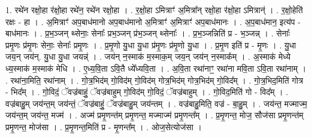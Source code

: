 \documentclass[17pt]{extarticle}
\begin{document}
1. रथे॑न रक्षो॒हा र॑क्षो॒हा रथे॑न॒ रथे॑न रक्षो॒हा । . र॒क्षो॒हा ऽमित्राꣳ॑ अ॒मित्रा᳚न् रक्षो॒हा र॑क्षो॒हा ऽमित्रान्॑ । . र॒क्षो॒हेति॑ रक्षः - हा । . अ॒मित्राꣳ॑ अप॒बाध॑मानो अप॒बाध॑मानो अ॒मित्राꣳ॑ अ॒मित्राꣳ॑ अप॒बाध॑मानः । . अ॒प॒बाध॑मान॒ इत्य॑प - बाध॑मानः । . प्र॒भ॒ञ्जन् थ्सेनाः॒ सेनाः᳚ प्रभ॒ञ्जन् प्र॑भ॒ञ्जन् थ्सेनाः᳚ । . प्र॒भ॒ञ्जन्निति॑ प्र - भ॒ञ्जन्न् । . सेनाः᳚ प्रमृ॒णः प्र॑मृ॒णः सेनाः॒ सेनाः᳚ प्रमृ॒णः । . प्र॒मृ॒णो यु॒धा यु॒धा प्र॑मृ॒णः प्र॑मृ॒णो यु॒धा । . प्र॒मृ॒ण इति॑ प्र - मृ॒णः । . यु॒धा जय॒न् जय॑न्. यु॒धा यु॒धा जयन्न्॑ । . जय॑न् न॒स्माक॑ म॒स्माक॒म् जय॒न् जय॑न् न॒स्माक᳚म् । . अ॒स्माक॑ मेध्ये ध्य॒स्माक॑ म॒स्माक॑ मेधि । . ए॒ध्य॒वि॒ता ऽवि॒तै ध्ये᳚ध्यवि॒ता । . अ॒वि॒ता रथा॑नाꣳ॒॒ रथा॑ना मवि॒ता ऽवि॒ता रथा॑नाम् । . रथा॑ना॒मिति॒ रथा॑नाम् । . गो॒त्र॒भिद॑म् गो॒विद॑म् गो॒विद॑म् गोत्र॒भिद॑म् गोत्र॒भिद॑म् गो॒विद᳚म् । . गो॒त्र॒भिद॒मिति॑ गोत्र - भिद᳚म् । . गो॒विदं॒ ॅवज्र॑बाहुं॒ ॅवज्र॑बाहुम् गो॒विद॑म् गो॒विदं॒ ॅवज्र॑बाहुम् । . गो॒विद॒मिति॑ गो - विद᳚म् । . वज्र॑बाहु॒म् जय॑न्त॒म् जय॑न्तं॒ ॅवज्र॑बाहुं॒ ॅवज्र॑बाहु॒म् जय॑न्तम् । . वज्र॑बाहु॒मिति॒ वज्र॑ - बा॒हु॒म् । . जय॑न्त॒ मज्माज्म॒ जय॑न्त॒म् जय॑न्त॒ मज्म॑ । . अज्म॑ प्रमृ॒णन्त॑म् प्रमृ॒णन्त॒ मज्माज्म॑ प्रमृ॒णन्त᳚म् । . प्र॒मृ॒णन्त॒ मोज॒ सौज॑सा प्रमृ॒णन्त॑म् प्रमृ॒णन्त॒ मोज॑सा । . प्र॒मृ॒णन्त॒मिति॑ प्र - मृ॒णन्त᳚म् । . ओज॒सेत्योज॑सा । \newline
\end{document}
